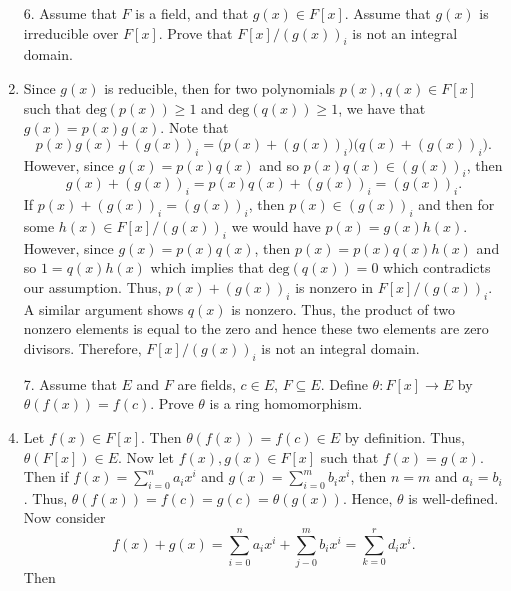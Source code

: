 \documentclass[12pt]{article}
\makeatletter
\theoremstyle{definition}
\theoremstyle{remark}
\renewenvironment{proof}[1][\proofname]{\par
  \pushQED{\qed}%
  \normalfont \topsep6\p@\@plus6\p@\relax
  \list{}{\leftmargin=0mm
          \rightmargin=4mm
          \settowidth{\itemindent}{\itshape#1}%
          \labelwidth=\itemindent
          \parsep=0pt \listparindent=\parindent 
  }
  \item[\hskip\labelsep
        \itshape
    #1\@addpunct{.}]\ignorespaces
}{%
  \popQED\endlist\@endpefalse
}
\let\oldproofname=\proofname
\renewcommand{\proofname}{\bf{\textit{\oldproofname}}}
\makeatother
\begin{document}
\begin{enumerate}[leftmargin=*]
        \item[6.] Assume that $F$ is a field, and that $g(x)\in F[x]$. Assume that $g(x)$ is irreducible over $F[x]$. Prove that $F[x]/(g(x))_i$ is not an integral domain.
            \begin{proof}
                Since $g(x)$ is reducible, then for two polynomials $p(x),q(x)\in F[x]$ such that $\text{deg}(p(x))\geq 1$ and $\text{deg}(q(x))\geq 1$, we have that $g(x)=p(x)g(x)$. Note that
                    \begin{equation*}
                        p(x)g(x)+(g(x))_i=\big(p(x)+(g(x))_i\big)\big(q(x)+(g(x))_i\big). 
                    \end{equation*}
                However, since $g(x)=p(x)q(x)$ and so $p(x)q(x)\in(g(x))_i$, then
                    \begin{equation*}
                        g(x)+(g(x))_i=p(x)q(x)+(g(x))_i=(g(x))_i.
                    \end{equation*}
                If $p(x)+(g(x))_i=(g(x))_i$, then $p(x)\in(g(x))_i$ and then for some $h(x)\in F[x]/(g(x))_i$ we would have $p(x)=g(x)h(x)$. However, since $g(x)=p(x)q(x)$, then $p(x)=p(x)q(x)h(x)$ and so $1=q(x)h(x)$ which implies that $\text{deg}(q(x))=0$ which contradicts our assumption. Thus, $p(x)+(g(x))_i$ is nonzero in $F[x]/(g(x))_i$. A similar argument shows $q(x)$ is nonzero. Thus, the product of two nonzero elements is equal to the zero and hence these two elements are zero divisors. Therefore, $F[x]/(g(x))_i$ is not an integral domain.
            \end{proof}
        \item[7.] Assume that $E$ and $F$ are fields, $c\in E$, $F\subseteq E$. Define $\theta\colon F[x]\rightarrow E$ by $\theta(f(x))=f(c)$. Prove $\theta$ is a ring homomorphism.
            \begin{proof}
                Let $f(x)\in F[x]$. Then $\theta(f(x))=f(c)\in E$ by definition. Thus, $\theta(F[x])\in E$. Now let $f(x),g(x)\in F[x]$ such that $f(x)=g(x)$. Then if $f(x)=\sum\limits_{i=0}^n a_ix^i$ and $g(x)=\sum\limits_{i=0}^m b_ix^i$, then $n=m$ and $a_i=b_i$. Thus, $\theta(f(x))=f(c)=g(c)=\theta(g(x))$. Hence, $\theta$ is well-defined. Now consider 
                    \begin{equation*}
                        f(x)+g(x)=\sum\limits_{i=0}^na_ix^i+\sum\limits_{j-0}^mb_ix^i=\sum\limits_{k=0}^rd_ix^i.
                    \end{equation*}
                Then 
                    \begin{equation*}

\end{equation*}
\end{proof}
\end{enumerate}
\end{document}
